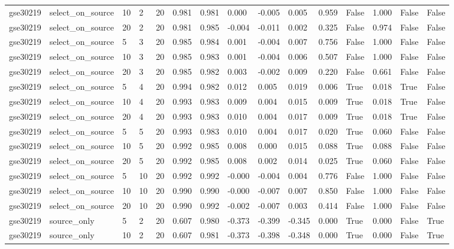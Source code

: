 \begin{table}[t]
\begin{tabular}{lllllllllllllll}
    gse30219 & select\_on\_source & 10 & 2 & 20 & 0.981 & 0.981 & 0.000 & -0.005 & 0.005 & 0.959 & False & 1.000 & False & False \\
    gse30219 & select\_on\_source & 20 & 2 & 20 & 0.981 & 0.985 & -0.004 & -0.011 & 0.002 & 0.325 & False & 0.974 & False & False \\
    gse30219 & select\_on\_source & 5 & 3 & 20 & 0.985 & 0.984 & 0.001 & -0.004 & 0.007 & 0.756 & False & 1.000 & False & False \\
    gse30219 & select\_on\_source & 10 & 3 & 20 & 0.985 & 0.983 & 0.001 & -0.004 & 0.006 & 0.507 & False & 1.000 & False & False \\
    gse30219 & select\_on\_source & 20 & 3 & 20 & 0.985 & 0.982 & 0.003 & -0.002 & 0.009 & 0.220 & False & 0.661 & False & False \\
    gse30219 & select\_on\_source & 5 & 4 & 20 & 0.994 & 0.982 & 0.012 & 0.005 & 0.019 & 0.006 & True & 0.018 & True & False \\
    gse30219 & select\_on\_source & 10 & 4 & 20 & 0.993 & 0.983 & 0.009 & 0.004 & 0.015 & 0.009 & True & 0.018 & True & False \\
    gse30219 & select\_on\_source & 20 & 4 & 20 & 0.993 & 0.983 & 0.010 & 0.004 & 0.017 & 0.009 & True & 0.018 & True & False \\
    gse30219 & select\_on\_source & 5 & 5 & 20 & 0.993 & 0.983 & 0.010 & 0.004 & 0.017 & 0.020 & True & 0.060 & False & False \\
    gse30219 & select\_on\_source & 10 & 5 & 20 & 0.992 & 0.985 & 0.008 & 0.000 & 0.015 & 0.088 & True & 0.088 & False & False \\
    gse30219 & select\_on\_source & 20 & 5 & 20 & 0.992 & 0.985 & 0.008 & 0.002 & 0.014 & 0.025 & True & 0.060 & False & False \\
    gse30219 & select\_on\_source & 5 & 10 & 20 & 0.992 & 0.992 & -0.000 & -0.004 & 0.004 & 0.776 & False & 1.000 & False & False \\
    gse30219 & select\_on\_source & 10 & 10 & 20 & 0.990 & 0.990 & -0.000 & -0.007 & 0.007 & 0.850 & False & 1.000 & False & False \\
    gse30219 & select\_on\_source & 20 & 10 & 20 & 0.990 & 0.992 & -0.002 & -0.007 & 0.003 & 0.414 & False & 1.000 & False & False \\
    gse30219 & source\_only & 5 & 2 & 20 & 0.607 & 0.980 & -0.373 & -0.399 & -0.345 & 0.000 & True & 0.000 & False & True \\
    gse30219 & source\_only & 10 & 2 & 20 & 0.607 & 0.981 & -0.373 & -0.398 & -0.348 & 0.000 & True & 0.000 & False & True \\

\end{tabular}
\end{table}
